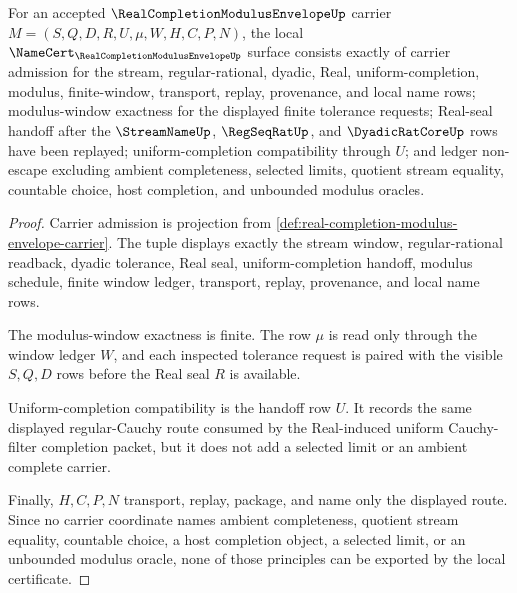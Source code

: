 \begin{theorem}
\label{thm:real-completion-modulus-envelope-namecert-obligations}
For an accepted $\RealCompletionModulusEnvelopeUp$ carrier $M=(S,Q,D,R,U,\mu,W,H,C,P,N)$, the local $\NameCert_{\RealCompletionModulusEnvelopeUp}$ surface consists exactly of carrier admission for the stream, regular-rational, dyadic, Real, uniform-completion, modulus, finite-window, transport, replay, provenance, and local name rows; modulus-window exactness for the displayed finite tolerance requests; Real-seal handoff after the $\StreamNameUp$, $\RegSeqRatUp$, and $\DyadicRatCoreUp$ rows have been replayed; uniform-completion compatibility through $U$; and ledger non-escape excluding ambient completeness, selected limits, quotient stream equality, countable choice, host completion, and unbounded modulus oracles.
\end{theorem}
\begin{proof}
Carrier admission is projection from \autoref{def:real-completion-modulus-envelope-carrier}. The tuple displays exactly the stream window, regular-rational readback, dyadic tolerance, Real seal, uniform-completion handoff, modulus schedule, finite window ledger, transport, replay, provenance, and local name rows.

The modulus-window exactness is finite. The row $\mu$ is read only through the window ledger $W$, and each inspected tolerance request is paired with the visible $S,Q,D$ rows before the Real seal $R$ is available.

Uniform-completion compatibility is the handoff row $U$. It records the same displayed regular-Cauchy route consumed by the Real-induced uniform Cauchy-filter completion packet, but it does not add a selected limit or an ambient complete carrier.

Finally, $H,C,P,N$ transport, replay, package, and name only the displayed route. Since no carrier coordinate names ambient completeness, quotient stream equality, countable choice, a host completion object, a selected limit, or an unbounded modulus oracle, none of those principles can be exported by the local certificate.
\end{proof}


